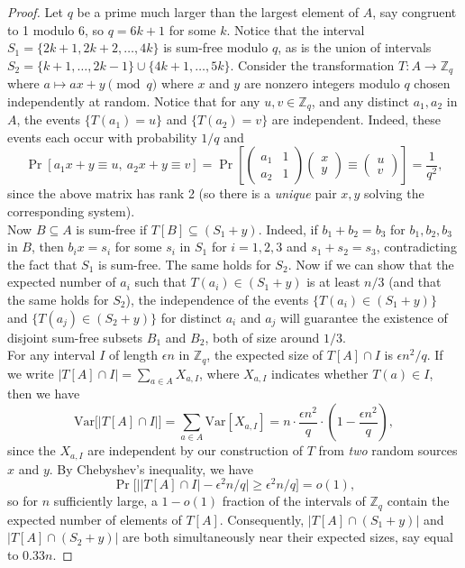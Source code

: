 \documentclass[11pt,letterpaper]{report}
\newcommand{\integers}{\mathbb{Z}}
\newcommand{\Var}{\text{Var}}
\begin{document}
\begin{proof}
    Let $q$ be a prime much larger than the largest element of $A$, say congruent to 1 modulo 6, so $q = 6k+1$ for some $k$.
    Notice that the interval $S_1 = \{2k+1, 2k+2, \ldots, 4k\}$ is sum-free modulo $q$, as is the union of intervals $S_2 = \{k+1, \ldots, 2k-1\}\cup \{4k+1, \ldots, 5k\}$.
    Consider the transformation $T:A\to \integers_q$ where $a\mapsto ax+y \pmod{q}$ where $x$ and $y$ are nonzero integers modulo $q$ chosen independently at random.
    Notice that for any $u,v\in \integers_q$, and any distinct $a_1, a_2$ in $A$, the events $\{T(a_1) = u\}$ and $\{T(a_2) = v\}$ are independent.
    Indeed, these events each occur with probability $1/q$ and
    \[
        \Pr[a_1x+y \equiv u,\ a_2x+y\equiv v] = \Pr\left[\begin{pmatrix}
            a_1 & 1\\
            a_2 & 1
        \end{pmatrix}\begin{pmatrix}
            x\\y
        \end{pmatrix}\equiv \begin{pmatrix}
            u\\v
        \end{pmatrix}\right] = \frac{1}{q^2},
    \]
    since the above matrix has rank 2 (so there is a \textit{unique} pair $x,y$ solving the corresponding system).\\

    Now $B\subseteq A$ is sum-free if $T[B] \subseteq (S_1+y)$.
    Indeed, if $b_1+b_2 = b_3$ for $b_1, b_2, b_3$ in $B$, then $b_ix = s_i$ for some $s_i$ in $S_1$ for $i = 1, 2, 3$ and $s_1+s_2= s_3$, contradicting the fact that $S_1$ is sum-free.
    The same holds for $S_2$.
    Now if we can show that the expected number of $a_i$ such that $T(a_i) \in (S_1+y)$ is at least $n/3$ (and that the same holds for $S_2$), the independence of the events $\{T(a_i) \in (S_1+y)\}$ and $\{T(a_j) \in (S_2+y)\}$ for distinct $a_i$ and $a_j$ will guarantee the existence of disjoint sum-free subsets $B_1$ and $B_2$, both of size around $1/3$.\\

    For any interval $I$ of length $\epsilon n$ in $\integers_q$, the expected size of $T[A]\cap I$ is $\epsilon n^2/q$.
    If we write $|T[A]\cap I| = \sum_{a\in A}X_{a, I}$, where $X_{a, I}$ indicates whether $T(a)\in I$, then we have
    \[
        \Var\bigg[|T[A]\cap I|\bigg]= \sum_{a\in A}\Var[X_{a, I}] = n\cdot \frac{\epsilon n^2}{q} \cdot \left(1 - \frac{\epsilon n^2}{q}\right),
    \]
    since the $X_{a, I}$ are independent by our construction of $T$ from \textit{two} random sources $x$ and $y$.
    By Chebyshev's inequality, we have
    \[
        \Pr\bigg[\big||T[A]\cap I| - \epsilon^2n/q| \geq \epsilon^2 n/q] = o(1),
    \]
    so for $n$ sufficiently large, a $1-o(1)$ fraction of the intervals of $\integers_q$ contain the expected number of elements of $T[A]$.
    Consequently, $|T[A]\cap (S_1+y)|$ and $|T[A]\cap (S_2+y)|$ are both simultaneously near their expected sizes, say equal to $0.33 n$.
\end{proof}
\end{document}
